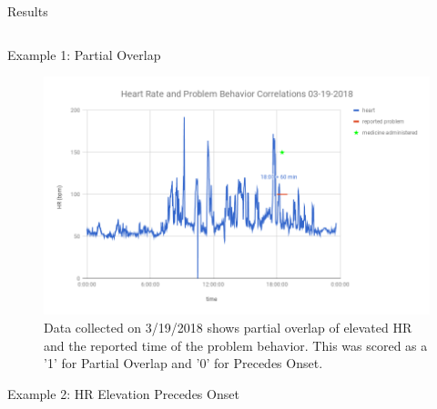 \documentclass[final]{beamer}
\newlength{\onecolwid}
\newlength{\twocolwid}
\begin{document}
\begin{frame}[t]
\begin{columns}[t]
\begin{column}{\twocolwid}
\begin{alertblock}{Results}
\end{alertblock}


\begin{columns}[t,totalwidth=\twocolwid] %

\begin{column}{\onecolwid}\vspace{-.6in} %



\begin{block}{Example 1: Partial Overlap}
	
	\begin{figure}
		\includegraphics[width=0.8\linewidth]{Example1.png}
		\caption{Data collected on 3/19/2018 shows partial overlap of elevated HR and the reported time of the problem behavior. This was scored as a '1' for Partial Overlap and '0' for Precedes Onset.}
	\end{figure}
	
\end{block}


\begin{block}{Example 2: HR Elevation Precedes Onset}
	

\end{block}
\end{column}
\end{columns}
\end{column}
\end{columns}
\end{frame}
\end{document}

